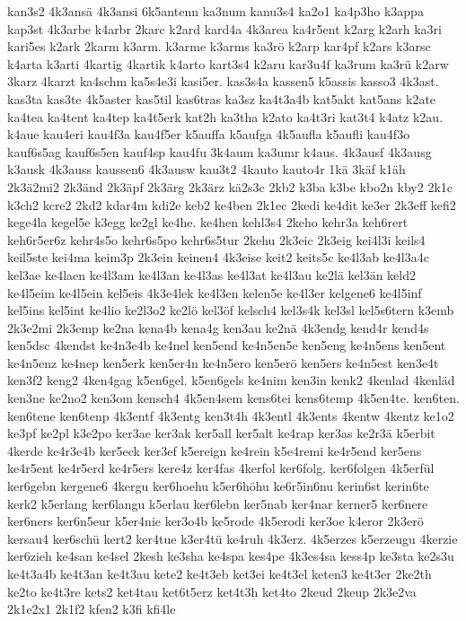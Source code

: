 {kan3s2
4k3ansä
4k3ansi
6k5antenn
ka3num
kanu3s4
ka2o1
ka4p3ho
k3appa
kap3st
4k3arbe
k4arbr
2karc
k2ard
kard4a
4k3area
ka4r5ent
k2arg
k2arh
ka3ri
kari5es
k2ark
2karm
k3arm.
k3arme
k3arms
ka3rö
k2arp
kar4pf
k2ars
k3arsc
k4arta
k3arti
4kartig
4kartik
k4arto
kart3s4
k2aru
kar3u4f
ka3rum
ka3rü
k2arw
3karz
4karzt
ka4schm
ka5s4e3i
kasi5er.
kas3s4a
kassen5
k5assis
kasso3
4k3ast.
kas3ta
kas3te
4k5aster
kas5til
kas6tras
ka3sz
ka4t3a4b
kat5akt
kat5ans
k2ate
ka4tea
ka4tent
ka4tep
ka4t5erk
kat2h
ka3tha
k2ato
ka4t3ri
kat3t4
k4atz
k2au.
k4aue
kau4eri
kau4f3a
kau4f5er
k5auffa
k5aufga
4k5aufla
k5aufli
kau4f3o
kauf6s5ag
kauf6s5en
kauf4sp
kau4fu
3k4aum
ka3umr
k4aus.
4k3ausf
4k3ausg
k3ausk
4k3auss
kaussen6
4k3ausw
kau3t2
4kauto
kauto4r
1kä
3käf
k1äh
2k3ä2mi2
2k3änd
2k3äpf
2k3ärg
2k3ärz
kä2s3c
2kb2
k3ba
k3be
kbo2n
kby2
2k1c
k3ch2
kcre2
2kd2
kdar4m
kdi2e
keb2
ke4ben
2k1ec
2kedi
ke4dit
ke3er
2k3eff
kefi2
kege4la
kegel5e
k3egg
ke2gl
ke4he.
ke4hen
kehl3s4
2keho
kehr3a
keh6rert
keh6r5er6z
kehr4s5o
kehr6s5po
kehr6s5tur
2kehu
2k3eic
2k3eig
kei4l3i
keils4
keil5ste
kei4ma
keim3p
2k3ein
keinen4
4k3eise
keit2
keits5c
ke4l3ab
ke4l3a4c
kel3ae
ke4laen
ke4l3am
ke4l3an
ke4l3as
ke4l3at
ke4l3au
ke2lä
kel3än
keld2
ke4l5eim
ke4l5ein
kel5eis
4k3e4lek
ke4l3en
kelen5e
ke4l3er
kelgene6
ke4l5inf
kel5ins
kel5int
ke4lio
ke2l3o2
ke2lö
kel3öf
kelsch4
kel3s4k
kel3sl
kel5s6tern
k3emb
2k3e2mi
2k3emp
ke2na
kena4b
kena4g
ken3au
ke2nä
4k3endg
kend4r
kend4s
ken5dsc
4kendst
ke4n3e4b
ke4nel
ken5end
ke4n5en5e
ken5eng
ke4n5ens
ken5ent
ke4n5enz
ke4nep
ken5erk
ken5er4n
ke4n5ero
ken5erö
ken5ers
ke4n5est
ken3e4t
ken3f2
keng2
4ken4gag
k5en6gel.
k5en6gels
ke4nim
ken3in
kenk2
4kenlad
4kenläd
ken3ne
ke2no2
ken3om
kensch4
4k5en4sem
kens6tei
kens6temp
4k5en4te.
ken6ten.
ken6tene
ken6tenp
4k3entf
4k3entg
ken3t4h
4k3entl
4k3ents
4kentw
4kentz
ke1o2
ke3pf
ke2pl
k3e2po
ker3ae
ker3ak
ker5all
ker5alt
ke4rap
ker3as
ke2r3ä
k5erbit
4kerde
ke4r3e4b
ker5eck
ker3ef
k5ereign
ke4rein
k5e4remi
ke4r5end
ker5ens
ke4r5ent
ke4r5erd
ke4r5ers
kere4z
ker4fas
4kerfol
ker6folg.
ker6folgen
4k5erfül
ker6gebn
kergene6
4kergu
ker6hoehu
k5er6höhu
ke6r5in6nu
kerin6st
kerin6te
kerk2
k5erlang
ker6langu
k5erlau
ker6lebn
ker5nab
ker4nar
kerner5
ker6nere
ker6ners
ker6n5eur
k5er4nie
ker3o4b
ke5rode
4k5erodi
ker3oe
k4eror
2k3erö
kersau4
ker6schü
kert2
ker4tue
k3er4tü
ke4ruh
4k3erz.
4k5erzes
k5erzeugu
4kerzie
ker6zieh
ke4san
ke4sel
2kesh
ke3sha
ke4spa
kes4pe
4k3es4sa
kess4p
ke3sta
ke2s3u
ke4t3a4b
ke4t3an
ke4t3au
kete2
ke4t3eb
ket3ei
ke4t3el
keten3
ke4t3er
2ke2th
ke2to
ke4t3re
kets2
ket4tau
ket6t5erz
ket4t3h
ket4to
2keud
2keup
2k3e2va
2k1e2x1
2k1f2
kfen2
k3fi
kfi4le
}
